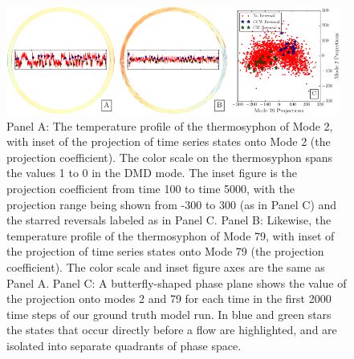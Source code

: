 \begin{figure}[h]
  \centering
  \includegraphics[width=0.98\textwidth]{../figures/combined-phase-potrait-2-79-python.pdf}
  \caption[]{
    Panel A: The temperature profile of the thermosyphon of Mode 2, with inset of the projection of time series states onto Mode 2 (the projection coefficient).
    The color scale on the thermosyphon spans the values 1 to 0 in the DMD mode.
    The inset figure is the projection coefficient from time 100 to time 5000, with the projection range being shown from -300 to 300 (as in Panel C) and the starred reversals labeled as in Panel C.
    Panel B: Likewise, the temperature profile of the thermosyphon of Mode 79, with inset of the projection of time series states onto Mode 79 (the projection coefficient).
    The color scale and inset figure axes are the same as Panel A.
    Panel C: A butterfly-shaped phase plane shows the value of the projection onto modes 2 and 79 for each time in the first 2000 time steps of our ground truth model run.
    In blue and green stars the states that occur directly before a flow are highlighted, and are isolated into separate quadrants of phase space.
  }
  \label{fig:DMD_phaseplane}
\end{figure}

